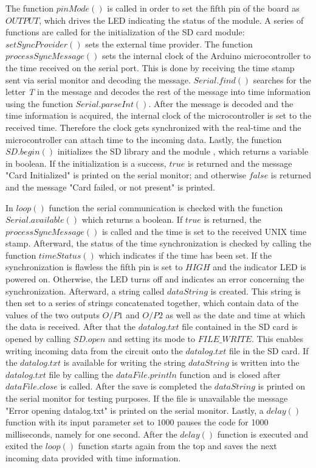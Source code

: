The function $pinMode()$ is called in order to set the fifth pin of the board as $OUTPUT$, which drives the LED indicating the status of the module. A series of functions are called for the initialization of the SD card module: $setSyncProvider()$ sets the external time provider.\cite{Time} The function $processSyncMessage()$ sets the internal clock of the Arduino microcontroller to the time received on the serial port. This is done by receiving the time stamp sent via serial monitor and decoding the message. $Serial.find()$ searches for the letter \textit{T} in the message and decodes the rest of the message into time information using the function $Serial.parseInt()$. After the message is decoded and the time information is acquired, the internal clock of the microcontroller is set to the received time. Therefore the clock gets synchronized with the real-time and the microcontroller can attach time to the incoming data. Lastly, the function $SD.begin()$ initializes the SD library and the module \cite{SD}, which returns a variable in boolean. If the initialization is a success, $true$ is returned and the message "Card Initialized" is printed on the serial monitor; and otherwise $false$ is returned and the message "Card failed, or not present" is printed. \par 
In $loop()$ function the serial communication is checked with the function $Serial.available()$ which returns a boolean. If $true$ is returned, the $processSyncMessage()$ is called and the time is set to the received UNIX time stamp. Afterward, the status of the time synchronization is checked by calling the function $timeStatus()$ which indicates if the time has been set.\cite{Time} If the synchronization is flawless the fifth pin is set to $HIGH$ and the indicator LED is powered on. Otherwise, the LED turns off and indicates an error concerning the synchronization. Afterward, a string called $dataString$ is created. This string is then set to a series of strings concatenated together, which contain data of the values of the two outputs $O/P1$ and $O/P2$ as well as the date and time at which the data is received. After that the $datalog.txt$ file contained in the SD card is opened by calling $SD.open$ and setting its mode to $FILE\_WRITE$. This enables writing incoming data from the circuit onto the $datalog.txt$ file in the SD card. If the $datalog.txt$ is available for writing the string $dataString$ is written into the $datalog.txt$ file by calling the $dataFile.println$ function and is closed after $dataFile.close$ is called. After the save is completed the $dataString$ is printed on the serial monitor for testing purposes. If the file is unavailable the message "Error opening datalog.txt" is printed on the serial monitor. Lastly, a $delay()$ function with its input parameter set to $1000$ pauses the code for 1000 milliseconds, namely for one second. After the $delay()$ function is executed and exited the $loop()$ function starts again from the top and saves the next incoming data provided with time information.         

